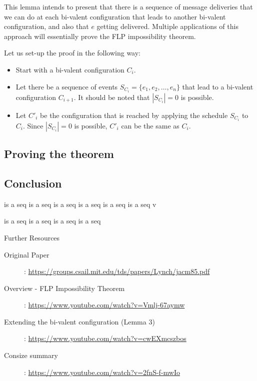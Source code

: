 This lemma intends to present that there is a sequence of message deliveries that we can do at each bi-valent configuration that leads to another bi-valent configuration, and also that $e$ getting delivered. Multiple applications of this approach will essentially prove the FLP impossibility theorem.

Let us set-up the proof in the following way:
\begin{itemize}
    \item Start with a bi-valent configuration $C_i$.
    \item Let there be a sequence of events $S_{C_i} = \{e_1, e_2, \ldots, e_n\}$ that lead to a bi-valent configuration $C_{i+1}$. It should be noted that $|S_{C_i}| = 0$ is possible.
    \item Let $C'_{i}$ be the configuration that is reached by applying the schedule $S_{C_i}$ to $C_i$. Since $|S_{C_i}| = 0$ is possible, $C'_{i}$ can be the same as $C_i$.
\end{itemize}


\subsection{Proving the theorem}

\subsection{Conclusion}
is a seq
is a seq
is a seq
is a seq
is a seq
is a seq
v

is a seq
is a seq
is a seq
is a seq

\begin{refbox}{Further Resources}
    \small
    \begin{description}
        \item [Original Paper]: \href{https://groups.csail.mit.edu/tds/papers/Lynch/jacm85.pdf}{https://groups.csail.mit.edu/tds/papers/Lynch/jacm85.pdf}
        \item [Overview - FLP Impossibility Theorem]: \href{https://www.youtube.com/watch?v=Vmlj-67aymw}{https://www.youtube.com/watch?v=Vmlj-67aymw}
        \item [Extending the bi-valent configuration (Lemma 3)]: \href{https://www.youtube.com/watch?v=cwEXmcszbos}{https://www.youtube.com/watch?v=cwEXmcszbos}
        \item [Consize summary]: \href{https://www.youtube.com/watch?v=2fnS-f-mwIo}{https://www.youtube.com/watch?v=2fnS-f-mwIo}
    \end{description}
\end{refbox}